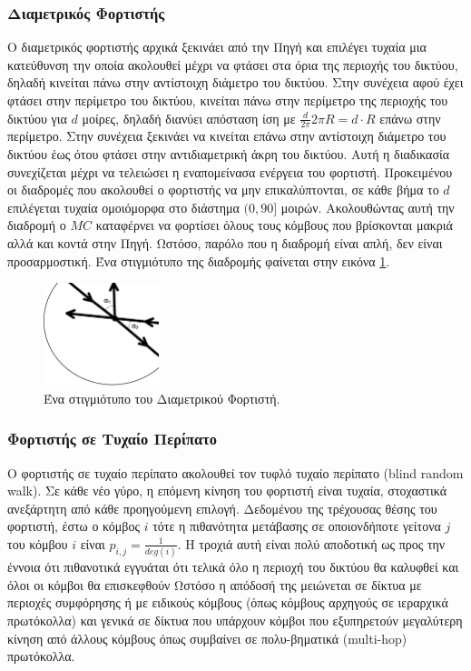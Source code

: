 \subsubsection{Διαμετρικός Φορτιστής}
Ο διαμετρικός φορτιστής αρχικά ξεκινάει από την Πηγή και επιλέγει τυχαία μια κατεύθυνση την οποία ακολουθεί μέχρι να φτάσει στα όρια της περιοχής του δικτύου, δηλαδή
κινείται πάνω στην αντίστοιχη διάμετρο του δικτύου. Στην συνέχεια αφού έχει φτάσει στην περίμετρο του δικτύου, κινείται πάνω στην περίμετρο της περιοχής του δικτύου
για $d$ μοίρες, δηλαδή διανύει απόσταση ίση με $\frac{d}{2\pi}2\pi R = d\cdot R$ επάνω στην περίμετρο. Στην συνέχεια ξεκινάει να κινείται επάνω στην αντίστοιχη
διάμετρο του δικτύου έως ότου φτάσει στην αντιδιαμετρική άκρη του δικτύου. Αυτή η διαδικασία συνεχίζεται μέχρι να τελειώσει η εναπομείνασα ενέργεια του φορτιστή.
Προκειμένου οι διαδρομές που ακολουθεί ο φορτιστής να μην επικαλύπτονται, σε κάθε βήμα το $d$ επιλέγεται τυχαία ομοιόμορφα στο διάστημα $(0,90]$ μοιρών. Ακολουθώντας
αυτή την διαδρομή ο $MC$ καταφέρνει να φορτίσει όλους τους κόμβους που βρίσκονται μακριά αλλά και κοντά στην Πηγή. Ωστόσο, παρόλο που η διαδρομή είναι απλή, δεν
είναι προσαρμοστική. Ένα στιγμιότυπο της διαδρομής φαίνεται στην εικόνα \ref{fig:diameter_charger}.
\vspace{0.9cm}
\begin{figure}[h]
	\centering
	\includegraphics[width=0.3\textwidth]{images/diameter.eps}
	\caption{Ένα στιγμιότυπο του Διαμετρικού Φορτιστή.}
	\label{fig:diameter_charger}
\end{figure}


\subsubsection{Φορτιστής σε Τυχαίο Περίπατο}
Ο φορτιστής σε τυχαίο περίπατο ακολουθεί τον τυφλό τυχαίο περίπατο (blind random walk). Σε κάθε νέο γύρο, η επόμενη κίνηση του φορτιστή είναι τυχαία, στοχαστικά
ανεξάρτητη από κάθε προηγούμενη επιλογή. Δεδομένου της τρέχουσας θέσης του φορτιστή, έστω ο κόμβος $i$ τότε η πιθανότητα μετάβασης σε οποιονδήποτε γείτονα $j$ του
κόμβου $i$ είναι $p_{i,j} =\frac{1}{deg(i)}$. Η τροχιά αυτή είναι πολύ αποδοτική ως προς την έννοια ότι πιθανοτικά εγγυάται ότι τελικά όλο η περιοχή του δικτύου θα
καλυφθεί και όλοι οι κόμβοι θα επισκεφθούν Ωστόσο η απόδοσή της μειώνεται σε δίκτυα με περιοχές συμφόρησης ή με ειδικούς κόμβους (όπως κόμβους αρχηγούς σε
ιεραρχικά πρωτόκολλα) και γενικά σε δίκτυα που υπάρχουν κόμβοι που εξυπηρετούν μεγαλύτερη κίνηση από άλλους κόμβους όπως συμβαίνει σε πολυ-βηματικά (multi-hop)
πρωτόκολλα.

